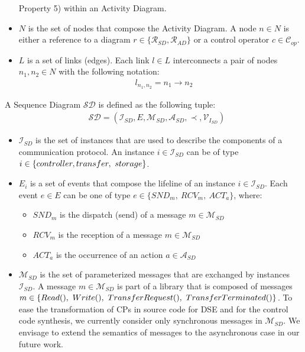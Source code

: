 \documentclass{llncs}
\begin{document}
\begin{subappendices}
\begin{itemize}
	Property 5) within an Activity Diagram.
	\item $N$ is the set of nodes that compose the Activity Diagram. A node $n \in N$ is either a reference to a diagram $r \in
	\{\mathcal{R}_{SD}, \mathcal{R}_{AD}\}$ or a
	control operator $c \in \mathcal{C}_{op}$.
	\item $L$ is a set of links (edges). Each link $l \in L$ interconnects a pair of nodes $n_1, n_2 \in N$ with the following
	notation:
		\begin{align*}
			&l_{n_1,n_2} = n_1 \rightarrow n_2
		\end{align*}
\end{itemize}
%
A Sequence Diagram $\mathcal{SD}$ is defined as the following tuple:
%
\begin{align*}
&\mathcal{SD} = ( \mathcal{I}_{SD}, E, \mathcal{M}_{SD}, \mathcal{A}_{SD}, \prec, \mathcal{V}_{{I}_{SD}} )
\end{align*}
%
%
\begin{itemize}
	\item $\mathcal{I}_{SD}$ is the set of instances that are used to describe the components of a communication protocol. An
	instance $i \in \mathcal{I}_{SD}$ can be of type $i \in \{controller,\\transfer,\ storage\}$.
	\item $E_i$ is a set of events that compose the lifeline of an instance $i \in \mathcal{I}_{SD}$. Each event $e \in E$ can be
	one of type $e \in \{SND_{m},\ RCV_{m},\ ACT_{a}\}$, where:
	\begin{itemize}
		\item $SND_{m}$ is the dispatch (send) of a message $m \in \mathcal{M}_{SD}$
		\item $RCV_{m}$ is the reception of a message $m \in \mathcal{M}_{SD}$ 
		\item $ACT_{a}$ is the occurrence of an action $a \in \mathcal{A}_{SD}$
	\end{itemize}
	\item $\mathcal{M}_{SD}$ is the set of parameterized messages that are exchanged by instances $\mathcal{I}_{SD}$. A
	message $m \in \mathcal{M}_{SD}$ is part of a library that is composed of messages $m \in \{Read(),\ Write(),\
	Transfer\-Request(),\ Transfer\-Terminated()\}$. To ease the transformation of CPs in source code for DSE and
	for the control code synthesis, we currently consider only synchronous messages in $\mathcal{M}_{SD}$. We
	envisage to extend the semantics of messages to the asynchronous case in our future work.

\end{itemize}
\end{subappendices}
\end{document}

